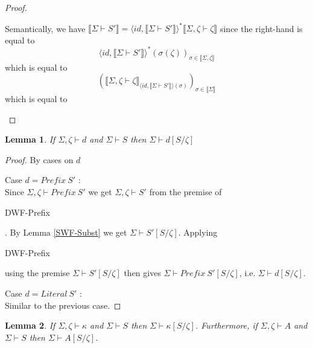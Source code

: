 \documentclass{article}
\newtheorem{lemma}{Lemma}
\newcommand{\sem}[1]{\llbracket #1 \rrbracket}
\begin{document}
\begin{proof}
\begin{description}
\begin{description}
Semantically, we have $\sem{\Sigma \vdash S'} = \langle \mathit{id}, \sem{\Sigma \vdash S'} \rangle^* \sem{\Sigma,\zeta \vdash \zeta}$ since the right-hand is equal to $$\langle \mathit{id}, \sem{\Sigma \vdash S'} \rangle^* (\sigma(\zeta))_{\sigma \in \sem{\Sigma,\zeta}}$$
which is equal to
$$( \sem{\Sigma,\zeta \vdash \zeta}_{\langle \mathit{id}, \sem{\Sigma \vdash S'} \rangle(\sigma)} )_{\sigma \in \sem{\Sigma}}$$
which is equal to
$$ $$
\end{description}

\end{description}

\end{proof}

\begin{lemma}
If $\Sigma,\zeta \vdash d$ and $\Sigma \vdash S$ then $\Sigma \vdash d[S/\zeta]$
\label{DWF-Subst}
\end{lemma}

\begin{proof}
By cases on $d$

\item[Case $d = \mathit{Prefix}~S'$]:\\
Since $\Sigma,\zeta \vdash \mathit{Prefix}~S'$ we get $\Sigma,\zeta \vdash S'$ from the premise of 
\begin{sc}DWF-Prefix\end{sc}. By Lemma \ref{SWF-Subst} we get $\Sigma \vdash S'[S/\zeta]$. Applying
\begin{sc}DWF-Prefix\end{sc} using the premise $\Sigma \vdash S'[S/\zeta]$ then gives $\Sigma \vdash \mathit{Prefix}~S'[S/\zeta]$, i.e. $\Sigma \vdash d[S/\zeta]$.

\item[Case $d = \mathit{Literal}~S'$]:\\
Similar to the previous case.

\end{proof}

\begin{lemma}
If $\Sigma,\zeta \vdash \kappa$ and $\Sigma \vdash S$ then $\Sigma \vdash \kappa[S/\zeta]$.
Furthermore, if $\Sigma,\zeta \vdash A$ and $\Sigma \vdash S$ then $\Sigma \vdash A[S/\zeta]$.
\end{lemma}
\end{document}

